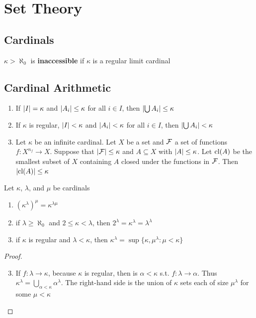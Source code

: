 \documentclass[11pt]{article}
\begin{document}
\appendix
\section{Set Theory}
\label{sec:org3b4cbe3}
\subsection{Cardinals}
\label{sec:org61951f4}
\(\kappa>\aleph_0\) is \textbf{inaccessible} if \(\kappa\) is a regular limit cardinal
\subsection{Cardinal Arithmetic}
\label{sec:org66144ae}
\begin{corollary}[]
\label{corA.15} 
\begin{enumerate}
\item If \(\abs{I}=\kappa\) and \(\abs{A_i}\le\kappa\) for all \(i\in I\), then 
\(\abs{\bigcup A_i}\le\kappa\)
\item If \(\kappa\) is regular, \(\abs{I}<\kappa\) and \(\abs{A_i}<\kappa\) for all 
\(i\in I\), then \(\abs{\bigcup A_i}<\kappa\)
\item Let \(\kappa\) be an infinite cardinal. Let \(X\) be a set and \(\mathcal{F}\) a set of
functions \(f:X^{n_f}\to X\). Suppose that \(\abs{\calf}\le\kappa\) and
\(A\subseteq X\) with \(\abs{A}\le\kappa\). Let \(\operatorname{\text{cl}}(A)\) be the smallest
subset of \(X\) containing \(A\) closed under the functions in \(\mathcal{F}\). Then 
\(\abs{\cl(A)}\le\kappa\)
\end{enumerate}
\end{corollary}

\begin{lemma}[]
Let \(\kappa\), \(\lambda\), and \(\mu\) be cardinals
\begin{enumerate}
\item \((\kappa^\lambda)^\mu=\kappa^{\lambda\mu}\)
\item if \(\lambda\ge\aleph_0\) and \(2\le\kappa<\lambda\), then \(2^\lambda=\kappa^\lambda=\lambda^\lambda\)
\item if \(\kappa\) is regular and \(\lambda<\kappa\), then \(\kappa^\lambda=\sup\{\kappa,\mu^\lambda:\mu<\kappa\}\)
\end{enumerate}
\end{lemma}

\begin{proof}
\begin{enumerate}
\setcounter{enumi}{2}
\item If \(f:\lambda\to\kappa\), because \(\kappa\) is regular, then is \(\alpha<\kappa\) s.t. \(f:\lambda\to\alpha\). Thus
\(\kappa^\lambda=\bigcup_{\alpha<\kappa}\alpha^\lambda\). The right-hand side is the union of \(\kappa\) sets each of size \(\mu^\lambda\) for some \(\mu<\kappa\)
\end{enumerate}
\end{proof}
\end{document}
